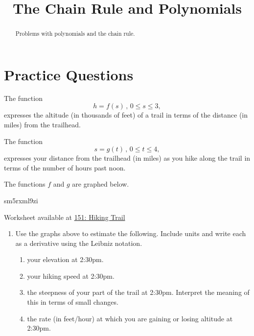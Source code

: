 \documentclass{ximera}
\title{The Chain Rule and Polynomials}
\begin{document}
\begin{abstract}
Problems with polynomials and the chain rule.
\end{abstract}
\maketitle

\section{Practice Questions}

\begin{question} \label{Q8dfDfrfrf}
The function
\[
      h = f(s) \, , \, 0\leq s \leq 3 ,
\]
expresses the altitude (in thousands of feet) of a trail in terms of the distance (in miles) from the trailhead.

The function
\[
    s = g(t) \, , \, 0\leq t \leq 4,
\]
expresses your distance from the trailhead (in miles) as you hike along the trail in terms of the number of hours past noon.

The functions $f$ and $g$ are graphed below.

\begin{onlineOnly}
    \begin{center}
   sm5rxml9zi
\end{center}
\end{onlineOnly}

Worksheet available at \href{https://www.desmos.com/calculator/sm5rxml9zi}{151: Hiking Trail}  %


\begin{enumerate}

\item Use the graphs above to estimate the following. Include units and write each as a derivative using the Leibniz notation.

\begin{enumerate}

\item your elevation at 2:30pm.

\item your hiking speed at 2:30pm.

\item the steepness of your part of the trail at 2:30pm. Interpret the meaning of this in terms of small changes.

\item the rate (in feet/hour) at which you are gaining or losing altitude at 2:30pm. 
\end{enumerate}


\end{enumerate}
\end{question}
\end{document}
